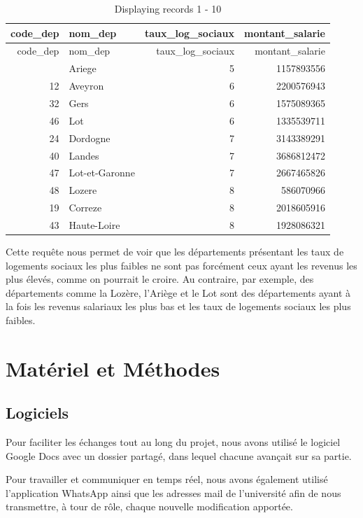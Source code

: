 \documentclass[mstat,12pt]{unswthesis}
\begin{document}
\begin{longtable}[]{@{}rlrr@{}}
\caption{Displaying records 1 - 10}\tabularnewline
\toprule\noalign{}
code\_dep & nom\_dep & taux\_log\_sociaux & montant\_salarie \\
\midrule\noalign{}
\endfirsthead
\toprule\noalign{}
code\_dep & nom\_dep & taux\_log\_sociaux & montant\_salarie \\
\midrule\noalign{}
\endhead
\bottomrule\noalign{}
\endlastfoot
9 & Ariege & 5 & 1157893556 \\
12 & Aveyron & 6 & 2200576943 \\
32 & Gers & 6 & 1575089365 \\
46 & Lot & 6 & 1335539711 \\
24 & Dordogne & 7 & 3143389291 \\
40 & Landes & 7 & 3686812472 \\
47 & Lot-et-Garonne & 7 & 2667465826 \\
48 & Lozere & 8 & 586070966 \\
19 & Correze & 8 & 2018605916 \\
43 & Haute-Loire & 8 & 1928086321 \\
\end{longtable}

\medskip

Cette requête nous permet de voir que les départements présentant les
taux de logements sociaux les plus faibles ne sont pas forcément ceux
ayant les revenus les plus élevés, comme on pourrait le croire. Au
contraire, par exemple, des départements comme la Lozère, l'Ariège et le
Lot sont des départements ayant à la fois les revenus salariaux les plus
bas et les taux de logements sociaux les plus faibles.

\chapter{Matériel et Méthodes}\label{matuxe9riel-et-muxe9thodes}

\section{Logiciels}\label{logiciels}

Pour faciliter les échanges tout au long du projet, nous avons utilisé
le logiciel Google Docs avec un dossier partagé, dans lequel chacune
avançait sur sa partie.

\medskip

Pour travailler et communiquer en temps réel, nous avons également
utilisé l'application WhatsApp ainsi que les adresses mail de
l'université afin de nous transmettre, à tour de rôle, chaque nouvelle
modification apportée.
\end{document}
